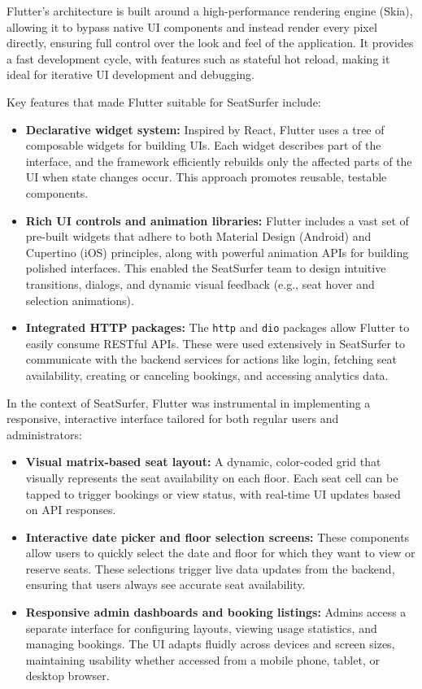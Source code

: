\documentclass[12pt,a4paper]{report}
\begin{document}
Flutter's architecture is built around a high-performance rendering engine (Skia), allowing it to bypass native UI components and instead render every pixel directly, ensuring full control over the look and feel of the application. It provides a fast development cycle, with features such as stateful hot reload, making it ideal for iterative UI development and debugging.

Key features that made Flutter suitable for SeatSurfer include:

\begin{itemize}
    \item \textbf{Declarative widget system:} Inspired by React, Flutter uses a tree of composable widgets for building UIs. Each widget describes part of the interface, and the framework efficiently rebuilds only the affected parts of the UI when state changes occur. This approach promotes reusable, testable components.
    
    \item \textbf{Rich UI controls and animation libraries:} Flutter includes a vast set of pre-built widgets that adhere to both Material Design (Android) and Cupertino (iOS) principles, along with powerful animation APIs for building polished interfaces. This enabled the SeatSurfer team to design intuitive transitions, dialogs, and dynamic visual feedback (e.g., seat hover and selection animations).
    
    \item \textbf{Integrated HTTP packages:} The \texttt{http} and \texttt{dio} packages allow Flutter to easily consume RESTful APIs. These were used extensively in SeatSurfer to communicate with the backend services for actions like login, fetching seat availability, creating or canceling bookings, and accessing analytics data.
\end{itemize}

In the context of SeatSurfer, Flutter was instrumental in implementing a responsive, interactive interface tailored for both regular users and administrators:

\begin{itemize}
    \item \textbf{Visual matrix-based seat layout:} A dynamic, color-coded grid that visually represents the seat availability on each floor. Each seat cell can be tapped to trigger bookings or view status, with real-time UI updates based on API responses.
    
    \item \textbf{Interactive date picker and floor selection screens:} These components allow users to quickly select the date and floor for which they want to view or reserve seats. These selections trigger live data updates from the backend, ensuring that users always see accurate seat availability.
    
    \item \textbf{Responsive admin dashboards and booking listings:} Admins access a separate interface for configuring layouts, viewing usage statistics, and managing bookings. The UI adapts fluidly across devices and screen sizes, maintaining usability whether accessed from a mobile phone, tablet, or desktop browser.
\end{itemize}
\end{document}
